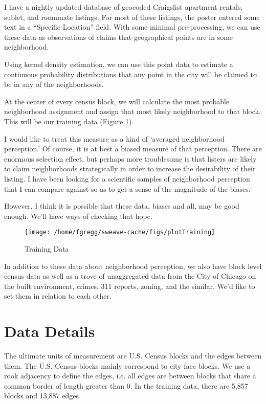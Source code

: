 \documentclass[12pt,letter]{article}\usepackage[]{graphicx}\usepackage[]{color}
\makeatletter
\def\maxwidth{ %
  \ifdim\Gin@nat@width>\linewidth
    \linewidth
  \else
    \Gin@nat@width
  \fi
}
\newenvironment{knitrout}{}{} %
\makeatother
\begin{document}
I have a nightly updated database of geocoded Craigslist apartment
rentals, sublet, and roommate listings. For most of these listings,
the poster entered some text in a ``Specific Location'' field. With
some minimal pre-processing, we can use these data as observations of
claims that geographical points are in some neighborhood.

Using kernel density estimation, we can use this point data to
estimate a continuous probability distributions that any point in the
city will be claimed to be in any of the neighborhoods. 

At the center of every census block, we will calculate the most
probable neighborhood assignment and assign that most likely
neighborhood to that block. This will be our training data (Figure
\ref{fig:training}).

I would like to treat this measure as a kind of `averaged
neighborhood perception.' Of course, it is at best a biased measure of
that perception. There are enormous selection effect, but perhaps more
troublesome is that listers are likely to claim neighborhoods
strategically in order to increase the desirability of their
listing. I have been looking for a scientific samples of neighborhood
perception that I can compare against so as to get a sense of the
magnitude of the biases. 

However, I think it is possible that these data, biases and all, may
be good enough. We'll have ways of checking that hope.


\begin{figure}
\begin{knitrout}
\color{fgcolor}

{\centering \texttt{[image: /home/fgregg/sweave-cache/figs/plotTraining]} 

}



\end{knitrout}

\caption{Training Data}
\label{fig:training}
\end{figure}

In addition to these data about neighborhood perception, we also have
block level census data as well as a trove of unaggregated data from
the City of Chicago on the built environment, crimes, 311 reports,
zoning, and the similar. We'd like to set them in relation to each
other.

\section*{Data Details}
The ultimate units of measurement are U.S. Census blocks and the edges
between them. The U.S. Census blocks mainly correspond to city face blocks.
We use a rook adjacency to define the edges, i.e. all edges are between blocks
that share a common border of length greater than 0. In the training data,
there are 5,857 blocks and
  13,887 edges.
\end{document}
